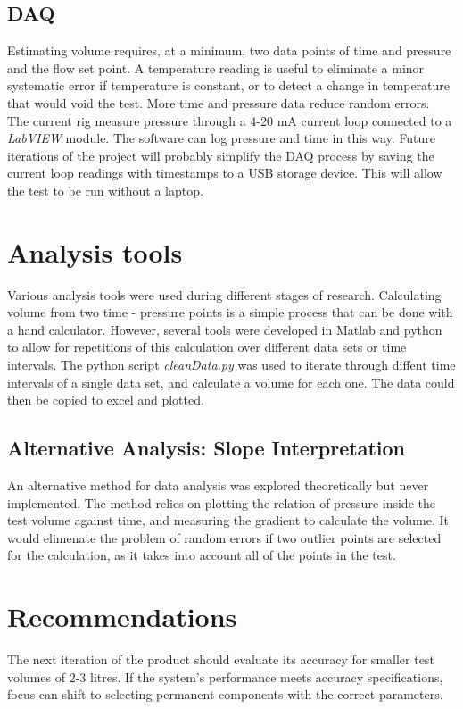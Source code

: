 \documentclass{report}
\begin{document}
\subsection{DAQ}
Estimating volume requires, at a minimum, two data points of time and pressure and the flow set point. A temperature reading is useful to eliminate a minor systematic error if temperature is constant, or to detect a change in temperature that would void the test. More time and pressure data reduce random errors. \\
The current rig measure pressure through a 4-20 mA current loop connected to a \textit{LabVIEW} module. The software can log pressure and time in this way. Future iterations of the project will probably simplify the DAQ process by saving the current loop readings with timestamps to a USB storage device. This will allow the test to be run without a laptop. 
\section{Analysis tools}
Various analysis tools were used during different stages of research. Calculating volume from two time - pressure points is a simple process that can be done with a hand calculator. However, several tools were developed in Matlab and python to allow for repetitions of this calculation over different data sets or time intervals. The python script \textit{cleanData.py} was used to iterate through diffent time intervals of a single data set, and calculate a volume for each one. The data could then be copied to excel and plotted. 
\subsection{Alternative Analysis: Slope Interpretation}
An alternative method for data analysis was explored theoretically but never implemented. The method relies on plotting the relation of pressure inside the test volume against time, and measuring the gradient to calculate the volume. It would elimenate the problem of random errors if two outlier points are selected for the calculation, as it takes into account all of the points in the test.

\section{Recommendations}
The next iteration of the product should evaluate its accuracy for smaller test volumes of 2-3 litres. If the system's performance meets accuracy specifications, focus can shift to selecting permanent components with the correct parameters.
\end{document}
